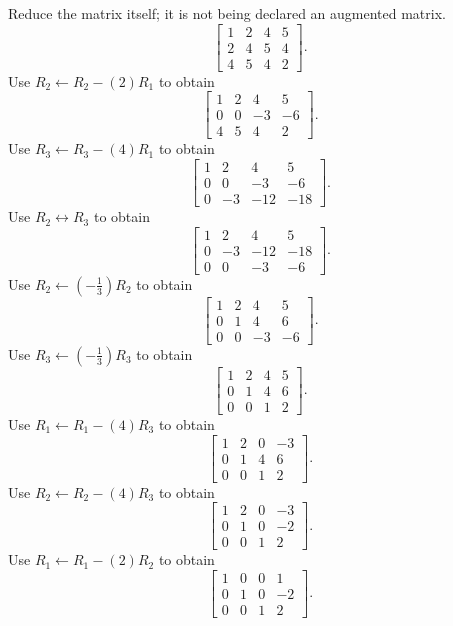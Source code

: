 \goal Reduce the matrix itself; it is not being declared an augmented matrix.
\[ \left[\begin{array}{rrrr}1&2&4&5\\2&4&5&4\\4&5&4&2\end{array}\right].\]
Use $R_{2}\leftarrow R_{2}-(2)R_{1}$ to obtain
\[ \left[\begin{array}{rrrr}1&2&4&5\\0&0&-3&-6\\4&5&4&2\end{array}\right].\]
Use $R_{3}\leftarrow R_{3}-(4)R_{1}$ to obtain
\[ \left[\begin{array}{rrrr}1&2&4&5\\0&0&-3&-6\\0&-3&-12&-18\end{array}\right].\]
Use $R_{2}\leftrightarrow R_{3}$ to obtain
\[ \left[\begin{array}{rrrr}1&2&4&5\\0&-3&-12&-18\\0&0&-3&-6\end{array}\right].\]
Use $R_{2}\leftarrow(- \frac{1}{3})R_{2}$ to obtain
\[ \left[\begin{array}{rrrr}1&2&4&5\\0&1&4&6\\0&0&-3&-6\end{array}\right].\]
Use $R_{3}\leftarrow(- \frac{1}{3})R_{3}$ to obtain
\[ \left[\begin{array}{rrrr}1&2&4&5\\0&1&4&6\\0&0&1&2\end{array}\right].\]
Use $R_{1}\leftarrow R_{1}-(4)R_{3}$ to obtain
\[ \left[\begin{array}{rrrr}1&2&0&-3\\0&1&4&6\\0&0&1&2\end{array}\right].\]
Use $R_{2}\leftarrow R_{2}-(4)R_{3}$ to obtain
\[ \left[\begin{array}{rrrr}1&2&0&-3\\0&1&0&-2\\0&0&1&2\end{array}\right].\]
Use $R_{1}\leftarrow R_{1}-(2)R_{2}$ to obtain
\[ \left[\begin{array}{rrrr}1&0&0&1\\0&1&0&-2\\0&0&1&2\end{array}\right].\]
